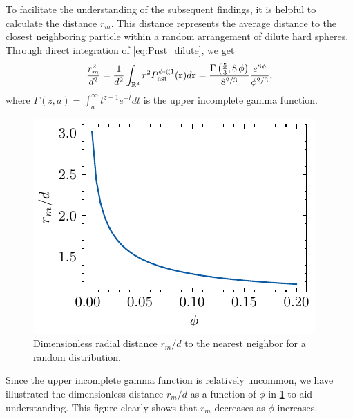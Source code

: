 To facilitate the understanding of the subsequent findings, it is helpful to calculate the distance $r_m$. 
This distance represents the average distance to the closest neighboring particle within a random arrangement of dilute hard spheres. 
Through direct integration of \ref{eq:Pnst_dilute}, we get
\begin{align}
    \frac{r_m^2}{d^2}
    = 
    \frac{1}{d^2}
    \int_{\mathbb{R}^3} r^2 P_\text{nst}^{\phi \ll 1}(\textbf{r}) d\textbf{r} 
    =  \frac{\Gamma\left({{5}\over{3}} , 8\,\phi\right)}{8^{2/3}}\frac{e^{8\phi}}{\phi^{2/3}},
\end{align}
where $\Gamma(z,a) = \int_a^\infty t^{z-1} e^{-t} dt$ is the upper incomplete gamma function.
\begin{figure}
  \centering
  \includegraphics[height = 0.3\textwidth]{image/HOMOGENEOUS_final/PA/rm.pdf}
  \caption{Dimensionless radial distance $r_m/d$ to the nearest neighbor for a random distribution.}
  \label{fig:agee}
\end{figure}
Since the upper incomplete gamma function is relatively uncommon, we have illustrated the dimensionless distance $r_m/d$ as a function of $\phi$ in \ref{fig:agee} to aid understanding. This figure clearly shows that $r_m$ decreases as $\phi$ increases.

